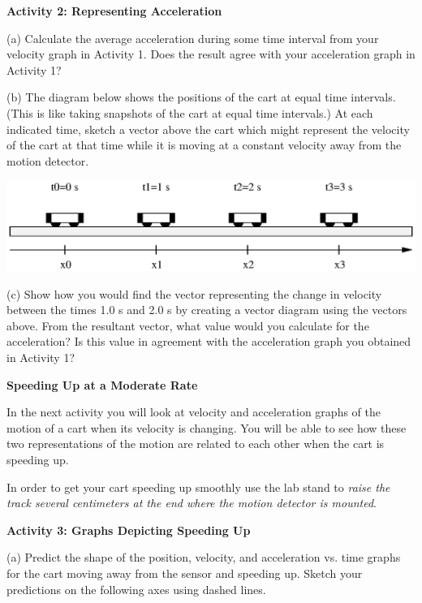 \textbf{Activity 2: Representing Acceleration} 

(a) Calculate the average acceleration during some time interval from your velocity graph in Activity 1.  Does the result agree with your acceleration graph in Activity 1?
\vspace{20mm}

(b) The diagram below shows the positions of the cart at equal time intervals.
(This is like taking snapshots of the cart at equal time intervals.) At each
indicated time, sketch a vector above the cart which might represent the velocity
of the cart at that time while it is moving at a constant velocity away from
the motion detector.

\vspace{0.3cm}
{\par\centering \includegraphics{changing/changing_fig3.eps} \par}
\vspace{0.3cm}

(c) Show how you would find the vector representing the change in velocity
between the times 1.0 s and 2.0 s by creating a vector diagram using the 
vectors above. From the resultant vector, what value would you calculate for 
the acceleration? Is this value in agreement
with the acceleration graph you obtained in Activity 1?
\vspace{20mm}

\textbf{Speeding Up at a Moderate Rate} 

In the next activity you will look at velocity and acceleration graphs of the
motion of a cart when its velocity is changing. You will be able to see how
these two representations of the motion are related to each other when the cart
is speeding up.

In order to get your cart speeding up smoothly use the lab stand to \textit{raise the
track several centimeters at the end where the motion detector is mounted}.

\textbf{Activity 3: Graphs Depicting Speeding Up} 

(a) Predict the shape of the position, velocity, and acceleration vs. time graphs
for the cart moving away from the sensor and speeding up. Sketch your predictions
on the following axes using dashed lines.

